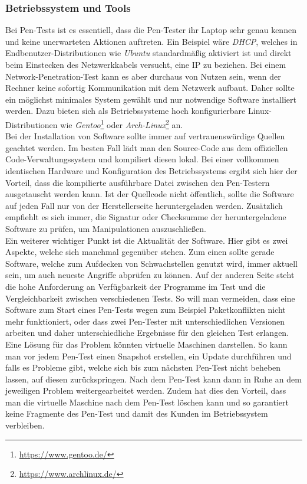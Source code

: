 		\subsubsection{Betriebssystem und Tools}
		Bei Pen-Tests ist es essentiell, dass die Pen-Tester ihr Laptop sehr genau kennen und keine unerwarteten Aktionen auftreten. Ein Beispiel wäre \textit{DHCP}, welches in Endbenutzer-Distributionen wie \textit{Ubuntu} standardmäßig aktiviert ist und direkt beim Einstecken des Netzwerkkabels versucht, eine IP zu beziehen. Bei einem Network-Penetration-Test kann es aber durchaus von Nutzen sein, wenn der Rechner keine sofortig Kommunikation mit dem Netzwerk aufbaut. Daher sollte ein möglichst minimales System gewählt und nur notwendige Software installiert werden. Dazu bieten sich als Betriebssysteme hoch konfigurierbare Linux-Distributionen wie \textit{Gentoo}\footnote{\url{https://www.gentoo.de/}} oder \textit{Arch-Linux}\footnote{\url{https://www.archlinux.de/}} an.\\
		 
		Bei der Installation von Software sollte immer auf vertrauenswürdige Quellen geachtet werden. Im besten Fall lädt man den Source-Code aus dem offiziellen Code-Verwaltungssystem und kompiliert diesen lokal. Bei einer vollkommen identischen Hardware und Konfiguration des Betriebssystems ergibt sich hier der Vorteil, dass die kompilierte ausführbare Datei zwischen den Pen-Testern ausgetauscht werden kann. Ist der Quellcode nicht öffentlich, sollte die Software auf jeden Fall nur von der Herstellerseite heruntergeladen werden. Zusätzlich empfiehlt es sich immer, die Signatur oder Checksumme der heruntergeladene Software zu prüfen, um Manipulationen auszuschließen.\\
		
		Ein weiterer wichtiger Punkt ist die Aktualität der Software. Hier gibt es zwei Aspekte, welche sich manchmal gegenüber stehen. Zum einen sollte gerade Software, welche zum Aufdecken von Schwachstellen genutzt wird, immer aktuell sein, um auch neueste Angriffe abprüfen zu können. Auf der anderen Seite steht die hohe Anforderung an Verfügbarkeit der Programme im Test und die Vergleichbarkeit zwischen verschiedenen Tests. So will man vermeiden, dass eine Software zum Start eines Pen-Tests wegen zum Beispiel Paketkonflikten nicht mehr funktioniert, oder dass zwei Pen-Tester mit unterschiedlichen Versionen arbeiten und daher unterschiedliche Ergebnisse für den gleichen Test erlangen. Eine Lösung für das Problem könnten virtuelle Maschinen darstellen. So kann man vor jedem Pen-Test einen Snapshot erstellen, ein Update durchführen und falls es Probleme gibt, welche sich bis zum nächsten Pen-Test nicht beheben lassen, auf diesen zurückspringen. Nach dem Pen-Test kann dann in Ruhe an dem jeweiligen Problem weitergearbeitet werden. Zudem hat dies den Vorteil, dass man die virtuelle Maschine nach dem Pen-Test löschen kann und so garantiert keine Fragmente des Pen-Test und damit des Kunden im Betriebssystem verbleiben.\\
		
